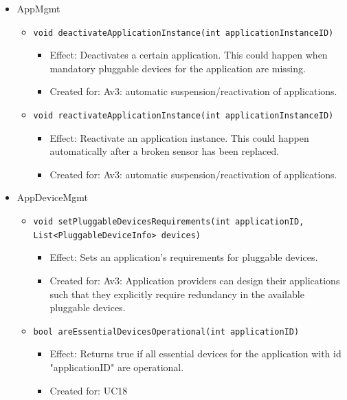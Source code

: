 \begin{itemize}
            \item AppMgmt
            \begin{itemize}
                \item \texttt{void deactivateApplicationInstance(int applicationInstanceID)}
                    \begin{itemize}
                        \item Effect: Deactivates a certain application. This could happen when
                              mandatory pluggable devices for the application are missing.
                        \item Created for: Av3: automatic suspension/reactivation of applications.
                    \end{itemize}
                \item \texttt{void reactivateApplicationInstance(int applicationInstanceID)}
                    \begin{itemize}
                        \item Effect: Reactivate an application instance. This could happen
                                      automatically after a broken sensor has been replaced.
                        \item Created for: Av3: automatic suspension/reactivation of applications.
                    \end{itemize}
            \end{itemize}

            \item AppDeviceMgmt
            \begin{itemize}
                \item \texttt{void setPluggableDevicesRequirements(int applicationID, List<PluggableDeviceInfo> devices)}
                \begin{itemize}
                    \item Effect: Sets an application's requirements for pluggable devices.
                    \item Created for: Av3: Application providers can design their applications
                          such that they explicitly require redundancy in
                          the available pluggable devices.
                \end{itemize}
                \item \texttt{bool areEssentialDevicesOperational(int applicationID)}
                \begin{itemize}
                    \item Effect: Returns true if all essential devices for the application
                                  with id "applicationID" are operational.
                    \item Created for: UC18
                \end{itemize}
            \end{itemize}
        \end{itemize}

